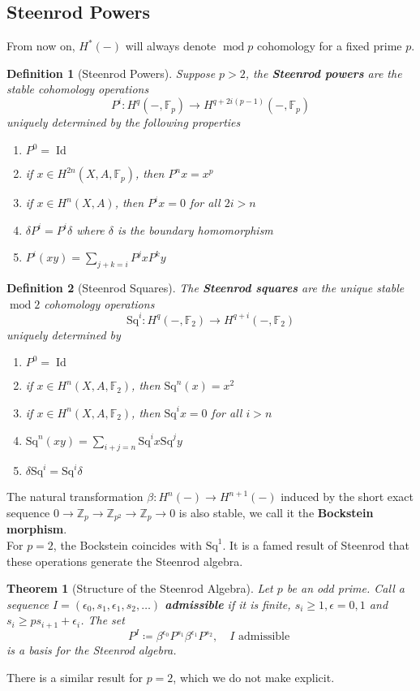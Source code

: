\documentclass[11pt, a4paper]{article}
\DeclareMathOperator*{\id}{Id}
\DeclareMathOperator*{\cmod}{mod}
\newcommand{\sq}{\mathrm{Sq}}
\newtheorem{thm}{Theorem}
\newtheorem{defn}{Definition}
\theoremstyle{plain}
\begin{document}
\subsection{Steenrod Powers}
From now on, $H^{\ast}( -) $ will always denote $\cmod p$ cohomology for a fixed prime $p$.
\begin{defn}[Steenrod Powers]
	Suppose $p>2$,
	the \textbf{Steenrod powers} are the stable cohomology operations 
	\[ 
		P^{i}\colon H^{q}( -, \mathbb{F}_p) \to H^{q+ 2i ( p-1) }( -, \mathbb{F}_p) 
	\]
	uniquely determined by the following properties
	\begin{enumerate}
	\item $P^{0}= \id$ 
	\item if $x \in H^{2n}( X,A, \mathbb{F}_p) $, then $P^{n}x = x^{p}$ 
	\item if $x \in H^{n}( X,A) $, then $P^{i}x =0$ for all $2i >n$ 
	\item $\delta P^{i} = P^{i}\delta$ where $\delta$ is the boundary homomorphism
	\item $P^{i}( xy) = \sum_{j+k=i} P^{j}x P^{k}y$
	\end{enumerate}
\end{defn}
\begin{defn}[Steenrod Squares]
	The \textbf{Steenrod squares} are the unique stable $\cmod 2$ cohomology operations
	$$
\sq ^{i} \colon H^{q}( -, \mathbb{F}_2) \to H^{q+i}( -, \mathbb{F}_2) 
$$
	uniquely determined by
	\begin{enumerate}
	\item $P^{0}= \id$ 
	\item if $x\in H^{n}( X, A, \mathbb{F}_2) $, then $\sq^{n}( x) = x^{2}$ 
	\item if $x \in H^{n}( X,A, \mathbb{F}_2) $, then $\sq^{i}x =0$ for all $i> n$ 
	\item $\sq^{n}( xy) = \sum_{i+j=n}\sq^{i}x \sq^{j}y$ 
	\item $\delta \sq^{i}= \sq^{i}\delta$ 
	\end{enumerate}
\end{defn}

The natural transformation $\beta\colon H^{n}( -) \to H^{n+1}( -) $ induced by the short exact sequence $0 \to \mathbb{Z}_p \to \mathbb{Z}_{p^{2}} \to \mathbb{Z}_p \to 0$ is also stable, we call it the \textbf{Bockstein morphism}.\\
For $p=2$, the Bockstein coincides with $\sq^{1}$.
It is a famed result of Steenrod that these operations generate the Steenrod algebra.
\begin{thm}[Structure of the Steenrod Algebra]\cite[Ch. VI, Sec. 2]{cohomology_operations_Steenrod}
	Let $p$ be an odd prime. Call a sequence $I = ( \epsilon_0, s_1, \epsilon_1, s_2, \ldots) $ \textbf{admissible} if it is finite, $s_i \geq 1, \epsilon = 0,1$ and $s_i \geq p s_{i+1} + \epsilon_i$. 
	The set
	\[ 
	P^{I} \coloneq \beta^{\epsilon_0}P^{s_1}\beta^{\epsilon_1}P^{s_2}, \quad I \text{ admissible } 
	\]
	is a basis for the Steenrod algebra.
\end{thm}
There is a similar result for $p=2$, which we do not make explicit.
\end{document}
